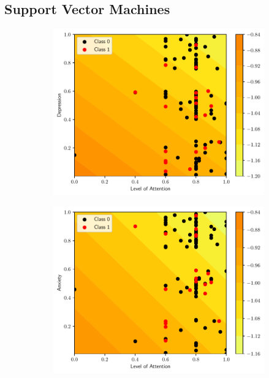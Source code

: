 \documentclass[conference]{IEEEtran}
\theoremstyle{definition}
\theoremstyle{remark}
\theoremstyle{remark}
\begin{document}
\subsection{Support Vector Machines}
\begin{figure}
    \centering
    \begin{subfigure}[b]{0.32\textwidth}
        \centering
        \includegraphics[width=\textwidth]{figs/svm-linear-contour-0-3.pdf}
        \caption{}
    \end{subfigure}
    \begin{subfigure}[b]{0.32\textwidth}
        \centering
        \includegraphics[width=\textwidth]{figs/svm-linear-contour-0-4.pdf}

\end{subfigure}
\end{figure}
\end{document}
